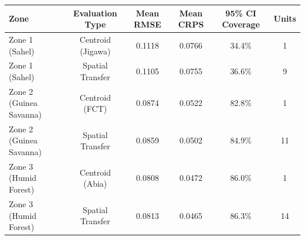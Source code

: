\begin{tabular}{lccccc}
\hline
Zone & Evaluation Type & Mean RMSE & Mean CRPS & 95\% CI Coverage & Units \\
\hline
Zone 1 (Sahel) & Centroid (Jigawa) & 0.1118 & 0.0766 & 34.4\% & 1 \\
Zone 1 (Sahel) & Spatial Transfer & 0.1105 & 0.0755 & 36.6\% & 9 \\
Zone 2 (Guinea Savanna) & Centroid (FCT) & 0.0874 & 0.0522 & 82.8\% & 1 \\
Zone 2 (Guinea Savanna) & Spatial Transfer & 0.0859 & 0.0502 & 84.9\% & 11 \\
Zone 3 (Humid Forest) & Centroid (Abia) & 0.0808 & 0.0472 & 86.0\% & 1 \\
Zone 3 (Humid Forest) & Spatial Transfer & 0.0813 & 0.0465 & 86.3\% & 14 \\
\hline
\end{tabular}
